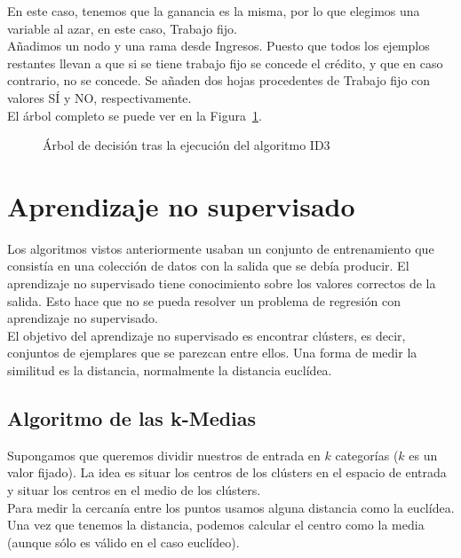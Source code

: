 \begin{ejemplo}
	En este caso, tenemos que la ganancia es la misma, por lo que elegimos una variable al azar, en este caso, Trabajo fijo.\\
	
	Añadimos un nodo y una rama desde Ingresos. Puesto que todos los ejemplos restantes llevan a que si se tiene trabajo fijo se concede el crédito, y que en caso contrario, no se concede. Se añaden dos hojas procedentes de Trabajo fijo con valores SÍ y NO, respectivamente.\\
	
	El árbol completo se puede ver en la Figura~\ref{fig:arboldecisionejemplo}.\\
	
	\begin{figure}[htbp!]
		\centering
		\ejemploarboldecision
		\label{fig:arboldecisionejemplo}
		\caption{Árbol de decisión tras la ejecución del algoritmo ID3}
	\end{figure}
\end{ejemplo}

\section{Aprendizaje no supervisado}

Los algoritmos vistos anteriormente usaban un conjunto de entrenamiento que consistía en una colección de datos con la salida que se debía producir. El aprendizaje no supervisado tiene conocimiento sobre los valores correctos de la salida. Esto hace que no se pueda resolver un problema de regresión con aprendizaje no supervisado.\\

El objetivo del aprendizaje no supervisado es encontrar clústers, es decir, conjuntos de ejemplares que se parezcan entre ellos. Una forma de medir la similitud es la distancia, normalmente la distancia euclídea.

\subsection{Algoritmo de las k-Medias}

Supongamos que queremos dividir nuestros de entrada en $k$ categorías ($k$ es un valor fijado). La idea es situar los centros de los clústers en el espacio de entrada y situar los centros en el medio de los clústers.\\

Para medir la cercanía entre los puntos usamos alguna distancia como la euclídea. Una vez que tenemos la distancia, podemos calcular el centro como la media (aunque sólo es válido en el caso euclídeo).\\


